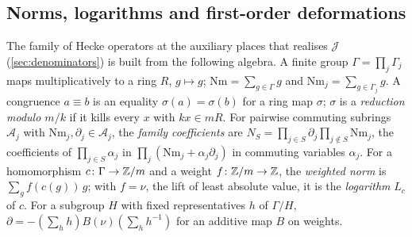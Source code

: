 \subsection{Norms, logarithms and first-order deformations}\label{ss:norms-logs}
The family of Hecke operators at the auxiliary places that realises $\mathcal J$ (\cref{sec:denominators}) is built from the following algebra. A finite group $\Gamma=\prod_j\Gamma_j$ maps multiplicatively to a ring $R$, $g\mapsto g$; $\mathrm{Nm}=\sum_{g\in\Gamma}g$ and
$\mathrm{Nm}_j=\sum_{g\in\Gamma_j}g$. A congruence $a\equiv b$ is an equality $\sigma(a)=\sigma(b)$ for a ring map $\sigma$; $\sigma$ is a \emph{reduction modulo $m/k$} if it kills every $x$ with $kx\in mR$. For pairwise commuting subrings $\mathcal A_j$ with
$\mathrm{Nm}_j,\partial_j\in\mathcal A_j$, the \emph{family coefficients} are $N_S=\prod_{j\in S}\partial_j\prod_{j\notin S}\mathrm{Nm}_j$, the coefficients of $\prod_{j\in S}\alpha_j$ in $\prod_j(\mathrm{Nm}_j+\alpha_j\partial_j)$ in commuting variables $\alpha_j$. For a homomorphism
$c\colon\Gamma\to\mathbb{Z}/m$ and a weight $f\colon\mathbb{Z}/m\to\mathbb{Z}$, the \emph{weighted norm} is $\sum_gf(c(g))\,g$; with $f=\nu$, the lift of least absolute value, it is the \emph{logarithm} $L_c$ of $c$. For a subgroup $H$ with fixed representatives $h$ of
$\Gamma/H$, $\partial=-(\sum_hh)B(\nu)(\sum_hh^{-1})$ for an additive map $B$ on weights.
